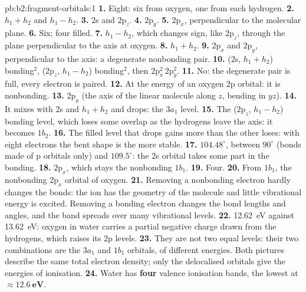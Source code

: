 \begin{solution}{pb:b2:fragment-orbitals:1}
\textbf{1.} Eight: six from oxygen, one from each hydrogen.
\textbf{2.} $h_1 + h_2$ and $h_1 - h_2$.
\textbf{3.} 2s and $2\mathrm p_z$.
\textbf{4.} $2\mathrm p_y$.
\textbf{5.} $2\mathrm p_x$, perpendicular to the molecular plane.
\textbf{6.} Six; four filled.
\textbf{7.} $h_1 - h_2$, which changes sign, like $2\mathrm p_z$, through the plane
perpendicular to the axis at oxygen.
\textbf{8.} $h_1 + h_2$.
\textbf{9.} $2\mathrm p_x$ and $2\mathrm p_y$, perpendicular to the axis: a degenerate
nonbonding pair.
\textbf{10.} (2s, $h_1 + h_2$) bonding$^2$, ($2\mathrm p_z$, $h_1 - h_2$) bonding$^2$, then
$2\mathrm p_x^2\,2\mathrm p_y^2$.
\textbf{11.} No: the degenerate pair is full, every electron is paired.
\textbf{12.} At the energy of an oxygen 2p orbital: it is nonbonding.
\textbf{13.} $2\mathrm p_y$ (the axis of the linear molecule along $z$, bending in $yz$).
\textbf{14.} It mixes with 2s and $h_1 + h_2$ and drops: the $3a_1$ level.
\textbf{15.} The ($2\mathrm p_z$, $h_1 - h_2$) bonding level, which loses some overlap as the
hydrogens leave the axis: it becomes $1b_2$.
\textbf{16.} The filled level that drops gains more than the other loses: with eight
electrons the bent shape is the more stable.
\textbf{17.} $104.48^\circ$, between $90^\circ$ (bonds made of p orbitals only) and $109.5^\circ$:
the 2s orbital takes some part in the bonding.
\textbf{18.} $2\mathrm p_x$, which stays the nonbonding $1b_1$.
\textbf{19.} Four.
\textbf{20.} From $1b_1$, the nonbonding $2\mathrm p_x$ orbital of oxygen.
\textbf{21.} Removing a nonbonding electron hardly changes the bonds: the ion has the
geometry of the molecule and little vibrational energy is excited. Removing a
bonding electron changes the bond lengths and angles, and the band spreads over
many vibrational levels.
\textbf{22.} \qty{12.62}{eV} against \qty{13.62}{eV}: oxygen in water carries a partial
negative charge drawn from the hydrogens, which raises its 2p levels.
\textbf{23.} They are not two equal levels: their two combinations are the $3a_1$ and
$1b_1$ orbitals, of different energies. Both pictures describe the same total
electron density; only the delocalised orbitals give the energies of ionisation.
\textbf{24.} Water has \textbf{four} valence ionisation bands, the lowest at
$\boldsymbol{\approx \qty{12.6}{eV}}$.
\end{solution}
